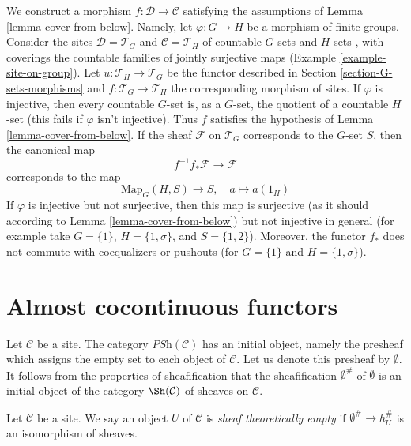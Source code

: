 \begin{example}
\label{example-cover-from-below}
We construct a morphism $f : \mathcal{D} \to \mathcal{C}$ satisfying
the assumptions of Lemma \ref{lemma-cover-from-below}. Namely, let
$\varphi : G \to H$ be a morphism of finite groups. Consider the sites
$\mathcal{D} = \mathcal{T}_G$ and $\mathcal{C} = \mathcal{T}_H$ of countable
$G$-sets and $H$-sets , with coverings the countable families of jointly
surjective maps (Example \ref{example-site-on-group}).
Let $u : \mathcal{T}_H \to \mathcal{T}_G$ be the functor described
in Section \ref{section-G-sets-morphisms}
and $f : \mathcal{T}_G \to \mathcal{T}_H$ the
corresponding morphism of sites. If $\varphi$ is injective, then
every countable $G$-set is, as a $G$-set, the quotient of a countable
$H$-set (this fails if $\varphi$ isn't injective). Thus $f$ satisfies
the hypothesis of Lemma \ref{lemma-cover-from-below}.
If the sheaf $\mathcal{F}$ on $\mathcal{T}_G$ corresponds to the $G$-set
$S$, then the canonical map
$$
f^{-1}f_*\mathcal{F} \longrightarrow \mathcal{F}
$$
corresponds to the map
$$
\text{Map}_G(H, S) \longrightarrow S,\quad
a \longmapsto a(1_H)
$$
If $\varphi$ is injective but not surjective, then this map is surjective
(as it should according to Lemma \ref{lemma-cover-from-below})
but not injective in general
(for example take $G = \{1\}$, $H = \{1, \sigma\}$, and $S = \{1, 2\}$).
Moreover, the functor $f_*$ does not commute with coequalizers or
pushouts (for $G = \{1\}$ and $H = \{1, \sigma\}$).
\end{example}





\section{Almost cocontinuous functors}
\label{section-almost-cocontinuous}

\noindent
Let $\mathcal{C}$ be a site. The category $\textit{PSh}(\mathcal{C})$ has
an initial object, namely the presheaf which assigns the empty set
to each object of $\mathcal{C}$. Let us denote this presheaf by
$\emptyset$. It follows from the properties of sheafification that the
sheafification $\emptyset^\#$ of $\emptyset$ is an initial object
of the category $\Sh(\mathcal{C})$ of sheaves on $\mathcal{C}$.

\begin{definition}
\label{definition-empty}
Let $\mathcal{C}$ be a site. We say an object $U$ of $\mathcal{C}$
is {\it sheaf theoretically empty} if $\emptyset^\# \to h_U^\#$
is an isomorphism of sheaves.
\end{definition}

